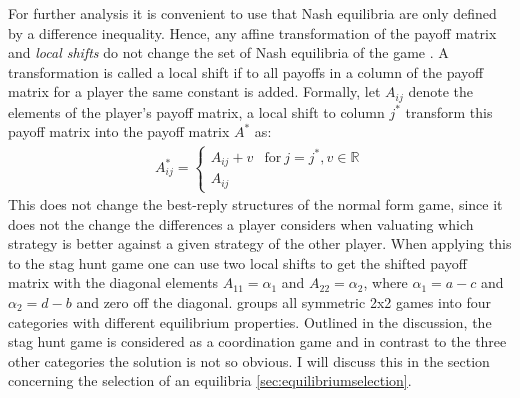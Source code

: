 \documentclass[11pt]{article}
\newcommand{\realnumb}{\mathbb{R}}
\begin{document}
For further analysis it is convenient to use that Nash equilibria are only
defined by a difference inequality. Hence, any affine transformation of the
payoff matrix and \textit{local shifts} do not change the set of Nash equilibria 
of the game \parencite[17-19]{weibull_evolutionary_1997}. A transformation is
called a local shift if to all payoffs in a column of the payoff matrix for 
a player the same constant is added. Formally, let $A_{ij}$ denote the 
elements of the player's payoff matrix, a local shift to column $j^*$ 
transform this payoff
matrix into the payoff matrix $A^*$ as:
\begin{align}
        A^*_{ij} =
        \begin{cases}
                A_{ij} + v & \text{for}\ j=j^*, v \in \realnumb \\
                A_{ij}
        \end{cases}
\end{align}
This does not change the best-reply structures of the normal form game,
since it does not the change the differences a player considers when valuating
which strategy is better against a given strategy of the other player. When 
applying this to the stag hunt game one can use two local shifts to get
the shifted payoff matrix with the diagonal elements $A_{11}=\alpha_1$ and 
$A_{22}=\alpha_2$, where $\alpha_1=a-c$ and $\alpha_2=d-b$ and 
zero off the diagonal. \textcite[28]{weibull_evolutionary_1997} 
groups all symmetric 2x2 games into four categories with different 
equilibrium properties. Outlined in the discussion, the stag hunt game 
is considered as a coordination game and in contrast to the three other
categories the solution is not so obvious. I will discuss this in the section
concerning the selection of an equilibria \ref{sec:equilibriumselection}.
\end{document}
